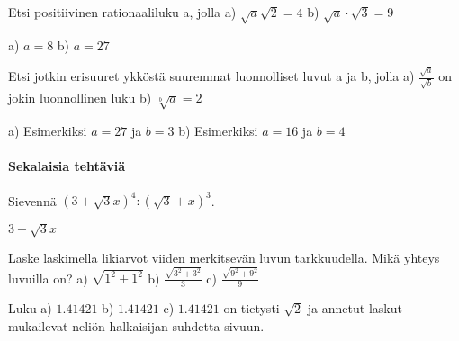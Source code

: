 \begin{tehtavasivu}
\begin{tehtava}
\begin{vastaus}

\begin{alakohdat}
\end{alakohdat}
\end{vastaus}
\end{tehtava}

\begin{tehtava} Etsi positiivinen rationaaliluku a, jolla
a) $\sqrt{a} \sqrt{2} = 4$  \quad b)   $ \sqrt{a}\cdot{\sqrt{3}} =9 $   \quad 
\begin{vastaus}
a) $a=8$ \quad b) $a=27$ \quad 
\end{vastaus}
\end{tehtava}


\begin{tehtava} Etsi jotkin erisuuret ykköstä suuremmat luonnolliset luvut a ja b, jolla 
a) $\frac{\sqrt{a}}{\sqrt{b}}$ on jokin luonnollinen luku  \quad b) $\sqrt[b]{a}=2$   
\begin{vastaus}
a) Esimerkiksi $a=27$ \quad ja \quad $b=3$  \quad b) Esimerkiksi $a=16$ \quad ja \quad $b=4$ 
\end{vastaus}
\end{tehtava}



\paragraph*{Sekalaisia tehtäviä}

\begin{tehtava}
Sievennä $(3+\sqrt{3}x)^4:(\sqrt{3}+x)^3$.
\begin{vastaus}
$3 + \sqrt{3}x$
\end{vastaus}
\end{tehtava}



\begin{tehtava} Laske laskimella likiarvot viiden merkitsevän luvun tarkkuudella. Mikä yhteys luvuilla on?
a) $ \sqrt{1^2+1^2}$ \quad b)  $ \frac {\sqrt{3^2+3^2}}{3}$    \quad c)  $ \frac {\sqrt{9^2+9^2}}{9}$  \quad 
\begin{vastaus}
Luku a) $1.41421$ \quad b) $1.41421$ \quad c) $1.41421$ \quad on tietysti $\sqrt{2}$ ja annetut laskut mukailevat neliön halkaisijan suhdetta sivuun.
\end{vastaus}
\end{tehtava}




\end{tehtavasivu}
